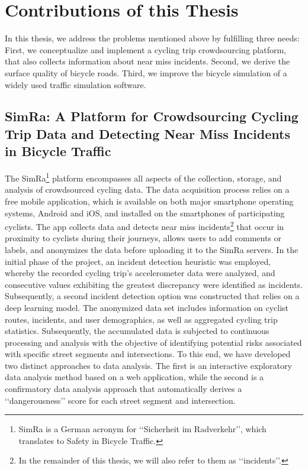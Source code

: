 \section{Contributions of this Thesis}
\label{sec:contributions}
In this thesis, we address the problems mentioned above by fulfilling three needs:
First, we conceptualize and implement a cycling trip crowdsourcing platform, that also collects information about near miss incidents.
Second, we derive the surface quality of bicycle roads.
Third, we improve the bicycle simulation of a widely used traffic simulation software.

\subsection{SimRa: A Platform for Crowdsourcing Cycling Trip Data and Detecting Near Miss Incidents in Bicycle Traffic}
\label{subsec:simra_contribution}
The SimRa\footnote{SimRa is a German acronym for ‘‘Sicherheit im Radverkehr’’, which translates to Safety in Bicycle Traffic.} platform encompasses all aspects of the collection, storage, and analysis of crowdsourced cycling data.
The data acquisition process relies on a free mobile application, which is available on both major smartphone operating systems, Android and iOS, and installed on the smartphones of participating cyclists.
The app collects data and detects near miss incidents\footnote{In the remainder of this thesis, we will also refer to them as ‘‘incidents’’.} that occur in proximity to cyclists during their journeys, allows users to add comments or labels, and anonymizes the data before uploading it to the SimRa servers.
In the initial phase of the project, an incident detection heuristic was employed, whereby the recorded cycling trip's accelerometer data were analyzed, and consecutive values exhibiting the greatest discrepancy were identified as incidents.
Subsequently, a second incident detection option was constructed that relies on a deep learning model.
The anonymized data set includes information on cyclist routes, incidents, and user demographics, as well as aggregated cycling trip statistics.
Subsequently, the accumulated data is subjected to continuous processing and analysis with the objective of identifying potential risks associated with specific street segments and intersections.
To this end, we have developed two distinct approaches to data analysis. The first is an interactive exploratory data analysis method based on a web application, while the second is a confirmatory data analysis approach that automatically derives a ‘‘dangerousness’’ score for each street segment and intersection. 


